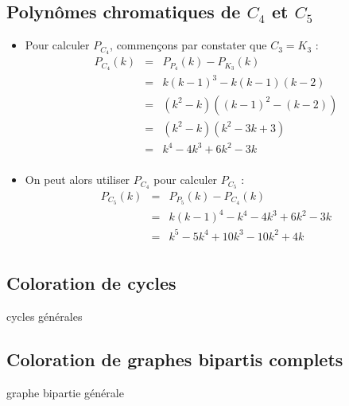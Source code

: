 \subsection{Polynômes chromatiques de $C_4$ et $C_5$}
\begin {itemize}
\item Pour calculer $P_{C_4}$, commençons par constater que $C_3 = K_3$ :
\begin{eqnarray*}
P_{C_4}(k)	& = &	P_{P_4}(k) - P_{K_3}(k)				\\
			& = & 	k(k-1)^3 - k(k-1)(k-2)				\\
			& = & 	(k^2 - k)((k-1)^2 - (k-2))			\\
			& = &	(k^2 - k)(k^2 - 3k + 3)				\\
			& = & 	k^4 - 4k^3 + 6k^2 - 3k				\\			
\end{eqnarray*}
\item On peut alors utiliser $P_{C_4}$ pour calculer $P_{C_5}$ :
\begin{eqnarray*}
P_{C_5}(k)	& = &	P_{P_5}(k) - P_{C_4}(k)				\\
			& = & 	k(k-1)^4 - k^4 -4k^3 + 6k^2 - 3k	\\
			& = &	k^5 - 5k^4 + 10k^3 - 10k^2 + 4k		\\ 
\end{eqnarray*}
\end {itemize}

\subsection{Coloration de cycles}
cycles générales

\subsection{Coloration de graphes bipartis complets}
graphe bipartie générale